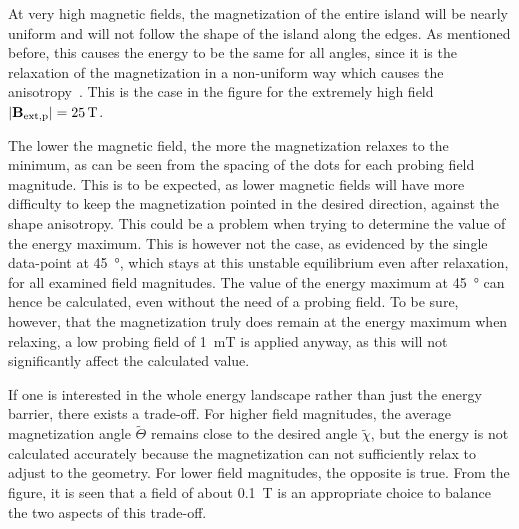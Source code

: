 \documentclass[11pt,a4paper,english]{article}
\begin{document}
At very high magnetic fields, the magnetization of the entire island will be nearly uniform and will not follow the shape of the island along the edges. As mentioned before, this causes the energy to be the same for all angles, since it is the relaxation of the magnetization in a non-uniform way which causes the anisotropy~\cite{Nonmonotonic_reversal}. This is the case in the figure for the extremely high field $\abs{\vb{B_\mathrm{ext,p}}}=\SI{25}{\tesla}$. \par
The lower the magnetic field, the more the magnetization relaxes to the minimum, as can be seen from the spacing of the dots for each probing field magnitude. This is to be expected, as lower magnetic fields will have more difficulty to keep the magnetization pointed in the desired direction, against the shape anisotropy. This could be a problem when trying to determine the value of the energy maximum. This is however not the case, as evidenced by the single data-point at \SI{45}{\degree}, which stays at this unstable equilibrium even after relaxation, for all examined field magnitudes. The value of the energy maximum at \SI{45}{\degree} can hence be calculated, even without the need of a probing field. To be sure, however, that the magnetization truly does remain at the energy maximum when relaxing, a low probing field of \SI{1}{\milli\tesla} is applied anyway, as this will not significantly affect the calculated value. \par
If one is interested in the whole energy landscape rather than just the energy barrier, there exists a trade-off. For higher field magnitudes, the average magnetization angle $\widetilde{\Theta}$ remains close to the desired angle $\widetilde{\chi}$, but the energy is not calculated accurately because the magnetization can not sufficiently relax to adjust to the geometry. For lower field magnitudes, the opposite is true. From the figure, it is seen that a field of about \SI{0.1}{\tesla} is an appropriate choice to balance the two aspects of this trade-off. \par
\end{document}
